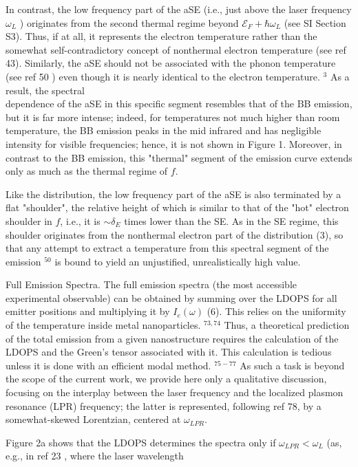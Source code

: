 \documentclass[10pt]{article}
\begin{document}
In contrast, the low frequency part of the aSE (i.e., just above the laser frequency $\omega_{L}$ ) originates from the second thermal regime beyond $\mathcal{E}_{F}+\hbar \omega_{L}$ (see SI Section S3). Thus, if at all, it represents the electron temperature rather than the somewhat self-contradictory concept of nonthermal electron temperature (see ref 43). Similarly, the aSE should not be associated with the phonon temperature (see ref 50 ) even though it is nearly identical to the electron temperature. ${ }^{3}$ As a result, the spectral\\
dependence of the aSE in this specific segment resembles that of the BB emission, but it is far more intense; indeed, for temperatures not much higher than room temperature, the BB emission peaks in the mid infrared and has negligible intensity for visible frequencies; hence, it is not shown in Figure 1. Moreover, in contrast to the BB emission, this "thermal" segment of the emission curve extends only as much as the thermal regime of $f$.

Like the distribution, the low frequency part of the aSE is also terminated by a flat "shoulder", the relative height of which is similar to that of the "hot" electron shoulder in $f$, i.e., it is $\sim \delta_{E}$ times lower than the SE. As in the SE regime, this shoulder originates from the nonthermal electron part of the distribution (3), so that any attempt to extract a temperature from this spectral segment of the emission ${ }^{50}$ is bound to yield an unjustified, unrealistically high value.

Full Emission Spectra. The full emission spectra (the most accessible experimental observable) can be obtained by summing over the LDOPS for all emitter positions and multiplying it by $I_{e}(\omega)$ (6). This relies on the uniformity of the temperature inside metal nanoparticles. ${ }^{73,74}$ Thus, a theoretical prediction of the total emission from a given nanostructure requires the calculation of the LDOPS and the Green's tensor associated with it. This calculation is tedious unless it is done with an efficient modal method. ${ }^{75-77}$ As such a task is beyond the scope of the current work, we provide here only a qualitative discussion, focusing on the interplay between the laser frequency and the localized plasmon resonance (LPR) frequency; the latter is represented, following ref 78, by a somewhat-skewed Lorentzian, centered at $\omega_{L P R}$.

Figure 2a shows that the LDOPS determines the spectra only if $\omega_{L P R}<\omega_{L}$ (as, e.g., in ref 23 , where the laser wavelength
\end{document}
